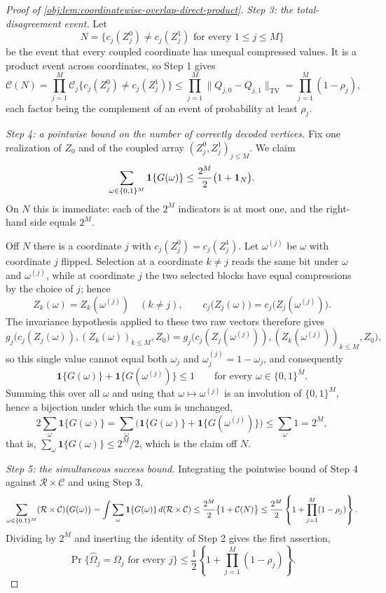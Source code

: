 \begin{proof}[Proof of \cref{obj:lem:coordinatewise-overlap-direct-product}]
\emph{Step 3: the total-disagreement event.}
Let
\[
N=\bigl\{c_j(Z_j^0)\neq c_j(Z_j^1)\text{ for every }1\leq j\leq M\bigr\}
\]
be the event that every coupled coordinate has unequal compressed values. It is a product event across coordinates, so Step 1 gives
\[
\mathcal C(N)
=\prod_{j=1}^M\mathcal C_j\bigl\{c_j(Z_j^0)\neq c_j(Z_j^1)\bigr\}
\leq\prod_{j=1}^M\lVert Q_{j,0}-Q_{j,1}\rVert_{\mathrm{TV}}
=\prod_{j=1}^M(1-\rho_j),
\]
each factor being the complement of an event of probability at least \(\rho_j\).

\emph{Step 4: a pointwise bound on the number of correctly decoded vertices.}
Fix one realization of \(Z_0\) and of the coupled array \((Z_j^0,Z_j^1)_{j\leq M}\). We claim
\[
\sum_{\omega\in\{0,1\}^M}\mathbf 1\{G(\omega)\}
\leq
{2^M\over2}\bigl(1+\mathbf 1_N\bigr).
\]
On \(N\) this is immediate: each of the \(2^M\) indicators is at most one, and the right-hand side equals \(2^M\).

Off \(N\) there is a coordinate \(j\) with \(c_j(Z_j^0)=c_j(Z_j^1)\). Let \(\omega^{(j)}\) be \(\omega\) with coordinate \(j\) flipped. Selection at a coordinate \(k\neq j\) reads the same bit under \(\omega\) and \(\omega^{(j)}\), while at coordinate \(j\) the two selected blocks have equal compressions by the choice of \(j\); hence
\[
Z_k(\omega)=Z_k(\omega^{(j)})\quad(k\neq j),
\qquad
c_j\bigl(Z_j(\omega)\bigr)=c_j\bigl(Z_j(\omega^{(j)})\bigr).
\]
The invariance hypothesis applied to these two raw vectors therefore gives
\[
g_j\bigl(c_j(Z_j(\omega)),(Z_k(\omega))_{k\leq M},Z_0\bigr)
=
g_j\bigl(c_j(Z_j(\omega^{(j)})),(Z_k(\omega^{(j)}))_{k\leq M},Z_0\bigr),
\]
so this single value cannot equal both \(\omega_j\) and \(\omega^{(j)}_j=1-\omega_j\), and consequently
\[
\mathbf 1\{G(\omega)\}+\mathbf 1\{G(\omega^{(j)})\}\leq1
\qquad\text{for every }\omega\in\{0,1\}^M .
\]
Summing this over all \(\omega\) and using that \(\omega\mapsto\omega^{(j)}\) is an involution of \(\{0,1\}^M\), hence a bijection under which the sum is unchanged,
\[
2\sum_{\omega}\mathbf 1\{G(\omega)\}
=
\sum_{\omega}\bigl(\mathbf 1\{G(\omega)\}+\mathbf 1\{G(\omega^{(j)})\}\bigr)
\leq
\sum_{\omega}1
=2^M,
\]
that is, \(\sum_\omega\mathbf 1\{G(\omega)\}\leq2^M/2\), which is the claim off \(N\).

\emph{Step 5: the simultaneous success bound.}
Integrating the pointwise bound of Step 4 against \(\mathcal R\times\mathcal C\) and using Step 3,
\[
\sum_{\omega\in\{0,1\}^M}(\mathcal R\times\mathcal C)\bigl(G(\omega)\bigr)
=
\int\sum_{\omega}\mathbf 1\{G(\omega)\}\,d(\mathcal R\times\mathcal C)
\leq
{2^M\over2}\bigl\{1+\mathcal C(N)\bigr\}
\leq
{2^M\over2}\left\{1+\prod_{j=1}^M(1-\rho_j)\right\}.
\]
Dividing by \(2^M\) and inserting the identity of Step 2 gives the first assertion,
\[
\Pr\{\widehat\Omega_j=\Omega_j\text{ for every }j\}
\leq
\frac12\left\{1+\prod_{j=1}^M(1-\rho_j)\right\}.
\]


\end{proof}
